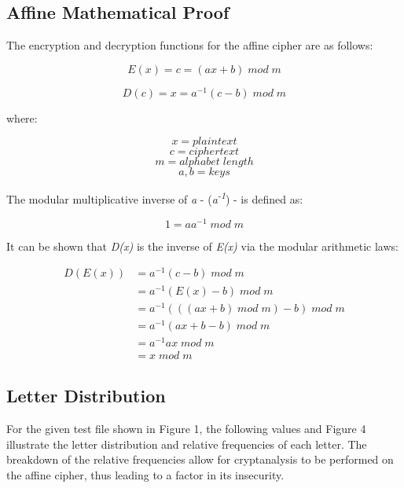 \documentclass[]{article}
\begin{document}
\newpage
\subsection*{Affine Mathematical Proof}

The encryption and decryption functions for the affine cipher are as follows:

$$E(x)=c=(ax+b)\;mod\;m$$

$$D(c)=x=a^{-1}(c-b)\;mod\;m$$

\noindent
where:

$$x = plaintext$$
$$c = ciphertext$$
$$m = alphabet\;length$$
$$a,b=keys$$
\vspace{0.5cm}

\noindent
The modular multiplicative inverse of \textit{a} - (\textit{a\textsuperscript{-1}}) -  is defined as:

$$1=aa^{-1}\;mod\;m$$

\noindent
It can be shown that \textit{D(x)} is the inverse of \textit{E(x)} via the modular arithmetic laws:

\begin{equation*}
\begin{split}
D(E(x)) & = a^{-1}(c-b)\;mod\;m \\
& = a^{-1}(E(x)-b)\;mod\;m \\
& = a^{-1}(( (ax+b)\;mod\;m )-b)\;mod\;m \\
& = a^{-1} (ax+b-b) \;mod\;m \\
& = a^{-1}ax\;mod\;m \\
& = x\;mod\;m
\end{split}
\end{equation*}

\newpage
\subsection*{Letter Distribution}

For the given test file shown in Figure 1, the following values and Figure 4 illustrate the letter distribution and relative frequencies of each letter. The breakdown of the relative frequencies allow for cryptanalysis to be performed on the affine cipher, thus leading to a factor in its insecurity.
\end{document}
